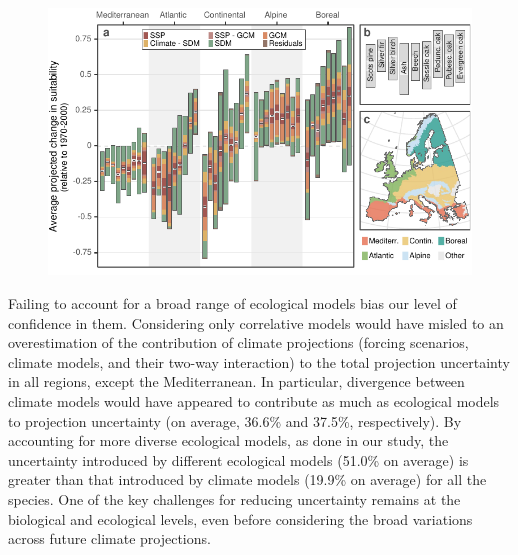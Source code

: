 \documentclass[11pt,letter]{article}
\begin{document}

\begin{figure}
	\centering
	\includegraphics[width=0.7\linewidth]{../newfigures/files/figure1}
	\caption{}
	\label{fig:anovaspecies}
\end{figure}

Failing to account for a broad range of ecological models bias our level of confidence in them. Considering only correlative models would have misled to an overestimation of the contribution of climate projections (forcing scenarios, climate models, and their two-way interaction) to the total projection uncertainty in all regions, except the Mediterranean. In particular, divergence between climate models would have appeared to contribute as much as ecological models to projection uncertainty (on average, 36.6\% and 37.5\%, respectively). By accounting for more diverse ecological models, as done in our study, the uncertainty introduced by different ecological models (51.0\% on average) is greater than that introduced by climate models (19.9\% on average) for all the species. One of the key challenges for reducing uncertainty remains at the biological and ecological levels, even before considering the broad variations across future climate projections.
\end{document}

